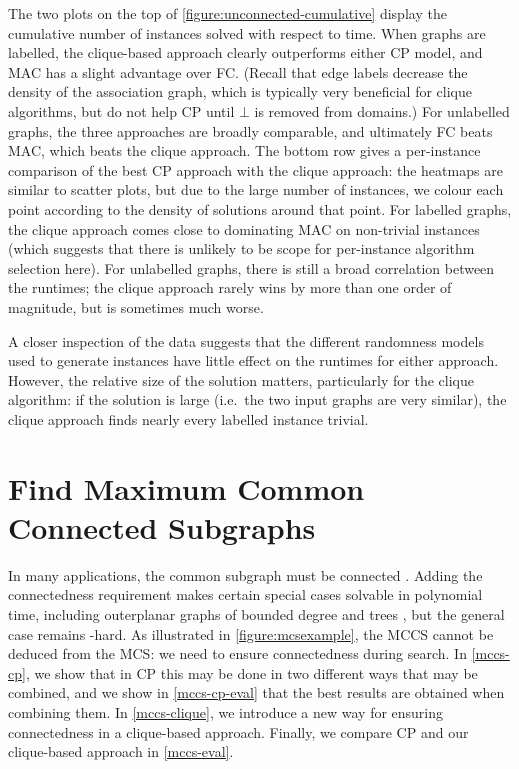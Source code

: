 \documentclass{llncs}
\begin{document}
The two plots on the top of \cref{figure:unconnected-cumulative} display the cumulative number of
instances solved with respect to time.  When graphs are labelled, the clique-based approach clearly
outperforms either CP model, and MAC has a slight advantage over FC. (Recall that edge labels
    decrease the density of the association graph, which is typically very beneficial for clique
algorithms, but do not help CP until $\bot$ is removed from domains.) For unlabelled graphs, the
three approaches are broadly comparable, and ultimately FC beats MAC, which beats the clique
approach. The bottom row gives a per-instance comparison of the best CP approach with the clique
approach: the heatmaps are similar to scatter plots, but due to the large number of instances, we
colour each point according to the density of solutions around that point. For labelled graphs, the
clique approach comes close to dominating MAC on non-trivial instances (which suggests that there is
unlikely to be scope for per-instance algorithm selection here). For unlabelled graphs, there is
still a broad correlation between the runtimes; the clique approach rarely wins by more than one
order of magnitude, but is sometimes much worse.

A closer inspection of the data suggests that the different randomness models used to generate
instances have little effect on the runtimes for either approach. However, the relative size of the
solution matters, particularly for the clique algorithm: if the solution is large (i.e.\ the two
input graphs are very similar), the clique approach finds nearly every labelled instance trivial.

\section{Find Maximum Common Connected Subgraphs}\label{mccs}

In many applications, the common subgraph must be connected
\cite{DBLP:journals/tcs/Koch01,DBLP:journals/jcamd/RaymondW02a,DBLP:conf/mco/VismaraV08,Ehrlich:2011}.
Adding the connectedness requirement makes certain special cases solvable in polynomial time,
including outerplanar graphs of bounded degree \cite{DBLP:journals/algorithms/AkutsuT13} and trees
\cite{droschinsky_et_al:LIPIcs:2016:xxxx}, but the general case remains \NP-hard. As illustrated in
\cref{figure:mcsexample}, the MCCS cannot be deduced from the MCS: we need to ensure connectedness
during search. In \cref{mccs-cp}, we show that in CP this may be done in two different ways that
may be combined, and we show in \cref{mccs-cp-eval} that the best results are obtained when
combining them. In \cref{mccs-clique}, we introduce a new way for ensuring connectedness in a
clique-based approach. Finally, we compare CP and our clique-based approach in \cref{mccs-eval}.
\end{document}

